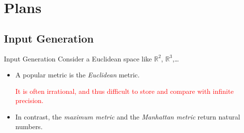 \documentclass[%
	sans,
	12pt,
]{beamer}
\newcommand{\bad}[1]{\textcolor{red}{#1}}
\newcommand{\RR}{\mathbb{R}}
\begin{document}

\section{Plans}
\subsection{Input Generation}%
\begin{frame}{Input Generation}
Consider a Euclidean space like $\RR^2$, $\RR^3$,\dots
	\begin{itemize}
		\item A popular metric is the \textit{Euclidean} metric.\pause
		
		\bad{It is often irrational, and thus difficult to store and compare with infinite precision.}\pause
		\item In contrast, the \textit{maximum metric} and the \textit{Manhattan metric} return natural numbers. %
	\end{itemize}
\end{frame}
\end{document}
